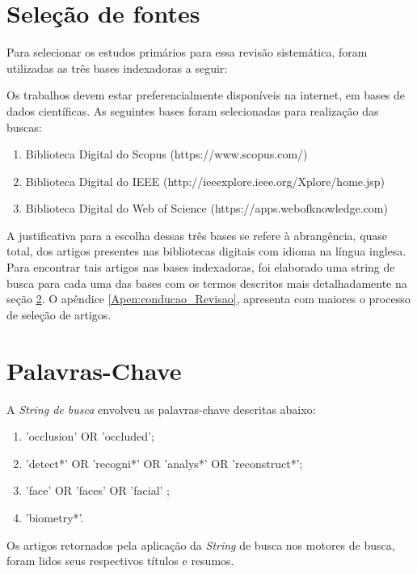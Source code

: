 \section{Seleção de fontes}
Para selecionar os estudos primários para essa revisão sistemática, foram utilizadas as três bases indexadoras a seguir:

Os trabalhos devem estar preferencialmente disponíveis na internet, em bases de dados científicas. As seguintes bases foram selecionadas para realização das buscas:

\begin{enumerate}
\item Biblioteca Digital do Scopus (https://www.scopus.com/)
\item Biblioteca Digital do IEEE (http://ieeexplore.ieee.org/Xplore/home.jsp)
\item Biblioteca Digital do Web of Science (https://apps.webofknowledge.com)
\end{enumerate}

A justificativa para a escolha dessas três bases se refere à abrangência, quase total, dos artigos presentes nas bibliotecas digitais com idioma na língua inglesa. Para encontrar tais artigos nas bases indexadoras, foi elaborado uma string de busca para cada uma das bases com os termos descritos mais detalhadamente na seção \ref{ap:palavraschave}. O apêndice \ref{Apen:conducao_Revisao}, apresenta com maiores o processo de seleção de artigos.



\section{Palavras-Chave}
\label{ap:palavraschave}
A \textit{String de busca} envolveu as palavras-chave descritas abaixo:

\begin{enumerate}
\item 'occlusion' OR 'occluded';
\item 'detect*' OR 'recogni*' OR 'analys*' OR 'reconstruct*';
\item 'face' OR 'faces' OR 'facial' ;
\item 'biometry*'.
\end{enumerate}

Os artigos retornados pela aplicação da \textit{String} de busca nos motores de busca, foram lidos seus respectivos títulos e resumos.

